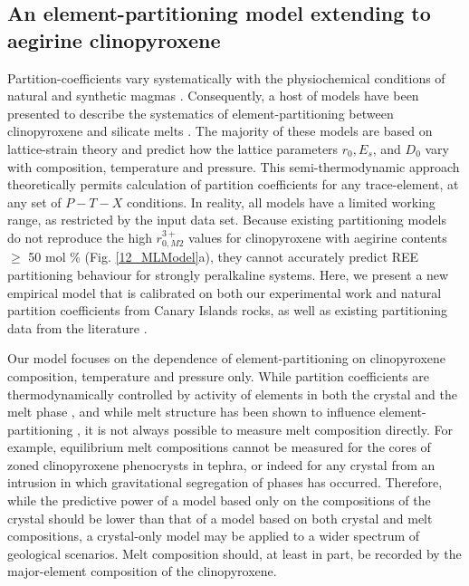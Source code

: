 \documentclass[review,authoryear,12pt]{elsarticle}
\begin{document}
\subsection{An element-partitioning model extending to aegirine clinopyroxene}
	Partition-coefficients vary systematically with the physiochemical conditions of natural and synthetic magmas \citep[cf.][]{Wood2003}. Consequently, a host of models 
    have been presented to describe the systematics of element-partitioning between clinopyroxene and silicate melts \citep{Wood1997, Wood2001charge, Hill2011, Yao2012, Sun2012, Bedard2014, Dygert2014, Mollo2016}. The majority of these models are based on lattice-strain theory and predict how the lattice parameters $r_0, E_s$, and $D_0$ vary with composition, temperature and pressure. This semi-thermodynamic approach theoretically permits calculation of partition coefficients for any trace-element, at any set of $P-T-X$ conditions. In reality, all models have a limited working range, as restricted by the input data set. 
	Because existing partitioning models do not reproduce the high $r_{0, M2}^{3+}$ values for clinopyroxene with aegirine contents $\geq$ 50 mol \% (Fig. \ref{12_MLModel}a), they cannot accurately predict REE partitioning behaviour for strongly peralkaline systems. Here, we present a new empirical model that is calibrated on both our experimental work and natural partition coefficients from Canary Islands rocks, as well as existing partitioning data from the literature \cite[compilation of][Fig. \ref{12_MLModel}, Table \ref{Ae_SupTbl}]{Bedard2014}. 
	
	Our model focuses on the dependence of element-partitioning on clinopyroxene composition, temperature and pressure only. While partition coefficients are thermodynamically controlled by activity of elements in both the crystal and the melt phase \citep{Wood2014}, and while melt structure has been shown to influence element-partitioning \citep{Huang2006, Schmidt2006, Mollo2017}, it is not always possible to measure melt composition directly. For example, equilibrium melt compositions cannot be measured for the cores of zoned clinopyroxene phenocrysts in tephra, or indeed for any crystal from an intrusion in which gravitational segregation of phases has occurred. 
	Therefore, while the predictive power of a model based only on the compositions of the crystal should be lower than that of a model based on both crystal and melt compositions, a crystal-only model may be applied to a wider spectrum of geological scenarios. Melt composition should, at least in part, be recorded by the major-element composition of the clinopyroxene.
	
\end{document}
